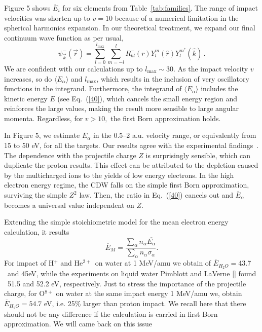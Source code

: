 \documentclass[preprint,showpacs,pra]{revtex4-1}
\begin{document}
Figure 5 shows $\overline{E}_{i}$ for six elements from 
Table~\ref{tab:families}. The range of impact velocities was shorten up 
to $v=10$ because of a numerical limitation in the spherical harmonics 
expansion. In our theoretical treatment, we expand our final continuum 
wave function as per usual,
\begin{equation}
\psi_{\overrightarrow{k}}^{-}(\overrightarrow{r})=\sum_{l=0}^{l_{\max
}}\sum_{m=-l}^{l}R_{kl}^{-}(r)Y_{l}^{m}(\widehat{r})Y_{l}^{m^{\ast }}
(\widehat{k})\,.
\label{60}
\end{equation}
We are confident with our calculations up to $l_{\max}\sim 30$. 
As the impact velocity $v$ increases, so do $\langle E_{\alpha}\rangle$
and $l_{\max}$, which results in the inclusion of very oscillatory 
functions in the integrand. Furthermore, the integrand of
$\langle E_{\alpha}\rangle$ includes the kinetic energy $E$
(see Eq.~(\ref{40}), which cancels the small energy region and 
reinforces the large values, making the result more sensible to large
angular momenta. Regardless, for $v>10,$ the first Born approximation 
holds.

In Figure 5, we estimate $\overline{E}_{\alpha}$ in the 0.5--2 a.u.
velocity range, or equivalently from 15 to 50 eV, for all the targets.
Our results agree with the experimental findings~\cite{surdutovic2018}. 
The dependence with the projectile charge $Z$ is surprisingly sensible,
which can duplicate the proton results. This effect can be attributed 
to the depletion caused by the multicharged ions to the yields of low 
energy electrons. In the high electron energy regime, the CDW falls on 
the simple first Born approximation, surviving the simple $Z^{2}$ law.
Then, the ratio in Eq.~(\ref{40}) cancels out and 
$\overline{E}_{\alpha}$ becomes a universal value independent on $Z$.

Extending the simple stoichiometric model for the mean electron energy
calculation, it results
\begin{equation}
\overline{E}_{M}=\frac{\sum\limits_{\alpha}n_{\alpha}
\overline{E_{\alpha}}}{\sum\limits_{\alpha}n_{\alpha}\sigma_{\alpha}}.
\label{70}
\end{equation}
For impact of H$^{+}$ and He$^{2+~}$ on water at 1 MeV/amu we obtain of 
$\overline{E}_{H_{2}O}=$43.7 \ and 45eV, while the experiments on liquid
water Pimblott and LaVerne [] found \ 51.5 and 52.2 eV, respectively. 
Just to stress the importance of the projectile charge, for O$^{8+}$ on 
water at the same impact energy 1 MeV/amu we, obtain 
$\overline{E}_{H_{2}O}=54.7$ eV, i.e. 25\% larger than proton impact. 
We recall here that there should not be any difference if the 
calculation is carried in first Born approximation. We will came back
on this issue
\end{document}
